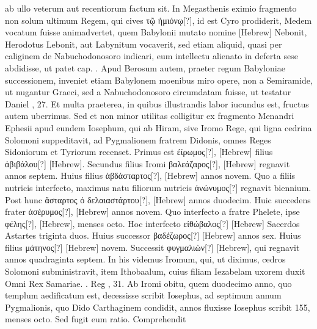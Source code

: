 ab ullo veterum aut recentiorum factum sit.
In Megasthenis eximio fragmento non solum ultimum Regem, qui cives
 \textgreek{τῷ ἡμιόνῳ[?]}, id
est Cyro prodiderit, Medem vocatum fuisse animadvertet, quem
Babylonii mutato nomine \texthebrew{}[Hebrew] Nebonit, Herodotus Lebonit,
aut Labynitum vocaverit, sed etiam aliquid, quasi per caliginem
de Nabuchodonosoro indicari, eum intellectu alienato in deferta
sese abdidisse, ut patet cap. .
Apud Berosum autem, praeter
regum Babyloniae successionem, inveniet etiam Babylonem moenibus
miro opere, non a Semiramide, ut nugantur Graeci, sed a Nabuchodonosoro
circumdatam fuisse, ut testatur Daniel , 27.
%
Et
multa praeterea, in quibus illustrandis labor iucundus est, fructus
autem uberrimus.
Sed et non minor utilitas colligitur ex fragmento
Menandri Ephesii apud eundem Iosephum, qui ab Hiram, sive
Iromo Rege, qui ligna cedrina Solomoni suppeditavit, ad Pygmalionem
fratrem Didonis, omnes Reges Sidoniorum et Tyriorum
recenset.
Primus est \textgreek{ἐίρωμος[?]}, \texthebrew{}[Hebrew]
 filius \textgreek{ἀβιβάλου[?]} \texthebrew{}[Hebrew].
Secundus filius Iromi \textgreek{βαλεάζαρος[?]},
 \texthebrew{}[Hebrew] regnavit annos septem.
Huius filius \textgreek{ἀβδάσταρτος[?]}, \texthebrew{}[Hebrew] annos novem.
Quo a filiis nutricis
interfecto, maximus natu filiorum nutricis \textgreek{ἀνώνυμος[?]} regnavit
biennium.
Post hunc \textgreek{ἄσταρτος ὁ δελαιαστάρτου[?]},
 \texthebrew{}[Hebrew] annos
duodecim.
Huic succedens frater \textgreek{ἀσέρυμος[?]},
 \texthebrew{}[Hebrew] annos novem.
Quo interfecto a fratre Phelete, ipse
 \textgreek{φέλης[?]}, \texthebrew{}[Hebrew], menses octo.
Hoc interfecto \textgreek{εἰθώβαλος[?]} \texthebrew{}[Hebrew]
 Sacerdos Astartes triginta
duos.
Huius successor \textgreek{βαδέζωρος[?]}
 \texthebrew{}[Hebrew] annos sex.
Huius filius
\textgreek{μάτηνος[?]} \texthebrew{}[Hebrew] novem.
Successit \textgreek{φυγμαλιὼν[?]}
 \texthebrew{}[Hebrew], qui regnavit
annos quadraginta septem.
In his videmus Iromum, qui, ut
diximus, cedros Solomoni subministravit, item Ithobaalum, cuius
filiam Iezabelam uxorem duxit Omni Rex Samariae. . Reg ,
31.
Ab Iromi obitu, quem duodecimo anno, quo templum aedificatum
est, decessisse scribit Iosephus, ad septimum annum Pygmalionis,
quo Dido Carthaginem condidit, annos fluxisse Iosephus
scribit 155, menses octo.
Sed fugit eum ratio.
Comprehendit
